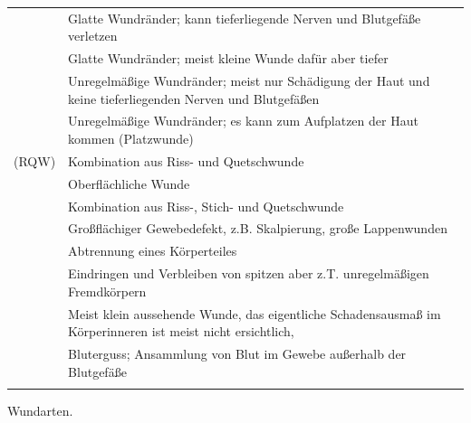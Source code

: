 {

}{

}{
\begin{tabulary}{\linewidth}{LL}
\addlinespace
\noindent{}
&
Glatte Wundränder; kann tieferliegende Nerven und Blutgefäße verletzen
\\\addlinespace
\noindent{}
&
Glatte Wundränder; meist kleine Wunde dafür aber tiefer
\\\addlinespace
\noindent{}
&
Unregelmäßige Wundränder; meist nur Schädigung der Haut und
	keine tieferliegenden Nerven und Blutgefäßen
\\\addlinespace
\noindent{}
&
Unregelmäßige Wundränder; es kann zum Aufplatzen der Haut kommen (Platzwunde)
\\\addlinespace
\noindent{} (RQW)
&
Kombination aus Riss- und Quetschwunde
\\\addlinespace
\noindent{} 
&
Oberflächliche Wunde
\\\addlinespace
\noindent{} 
&
Kombination aus Riss-, Stich- und Quetschwunde
\\\addlinespace
\noindent{} 
&
Großflächiger Gewebedefekt, z.B. Skalpierung, große Lappenwunden
\\\addlinespace
\noindent{} 
&
Abtrennung eines Körperteiles
\\\addlinespace
\noindent{} 
&
Eindringen und Verbleiben von spitzen aber z.T. unregelmäßigen Fremdkörpern
\\\addlinespace
\noindent{} 
&
Meist klein aussehende Wunde, das eigentliche Schadensausmaß im Körperinneren
ist meist nicht ersichtlich, 
\\\addlinespace
\noindent{} 
&
Bluterguss; Ansammlung von Blut im Gewebe außerhalb der Blutgefäße 
\\\addlinespace\bottomrule
\end{tabulary}
}{Wundarten.}{}


